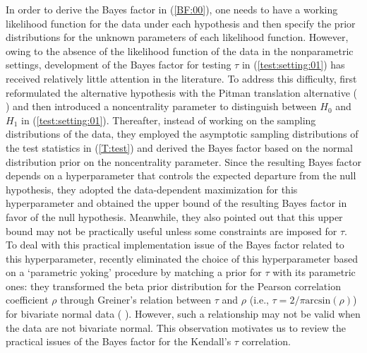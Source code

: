 \documentclass[11pt]{article}
\begin{document}
In order to derive the Bayes factor in (\ref{BF:00}), one needs to have a working likelihood function for the data under each hypothesis and then specify the prior distributions for the unknown parameters of each likelihood function. However, owing to the absence of the likelihood function of the data in the nonparametric settings, development of the Bayes factor for testing $\tau$ in (\ref{test:setting:01}) has received relatively little attention in the literature. To address this difficulty, \cite{Yuan:John:2008} first reformulated the alternative hypothesis with the Pitman translation alternative (\citeauthor{Rank:Wolf:1979} \citeyear{Rank:Wolf:1979}) and then introduced a noncentrality parameter to distinguish between $H_0$ and $H_1$ in (\ref{test:setting:01}). Thereafter, instead of working on the sampling distributions of the data, they employed the asymptotic sampling distributions of the test statistics in (\ref{T:test}) and derived the Bayes factor based on the normal distribution prior on the noncentrality parameter. Since the resulting Bayes factor depends on a hyperparameter that controls the expected departure from the null hypothesis, they adopted the data-dependent maximization for this hyperparameter and obtained the upper bound of the resulting Bayes factor in favor of the null hypothesis. Meanwhile, they also pointed out that this upper bound may not be practically useful unless some constraints are imposed for $\tau$.
To deal with this practical implementation issue of the Bayes factor related to this hyperparameter, \cite{Doorn:Ly:Wage:2018} recently  eliminated the choice of this hyperparameter based on a `parametric yoking' procedure by matching a prior for $\tau$ with its parametric ones: they transformed the beta prior distribution for the Pearson correlation coefficient $\rho$ through Greiner’s relation between $\tau$ and  $\rho$ (i.e., $\tau = 2/\pi\mathrm{arcsin}(\rho)$) for bivariate normal data (\citeauthor{Krus:1958} \citeyear{Krus:1958}). However, such a relationship may not be valid when the data are not bivariate normal. This observation motivates us to review the practical issues of the Bayes factor for the Kendall's $\tau$ correlation.
\end{document}
